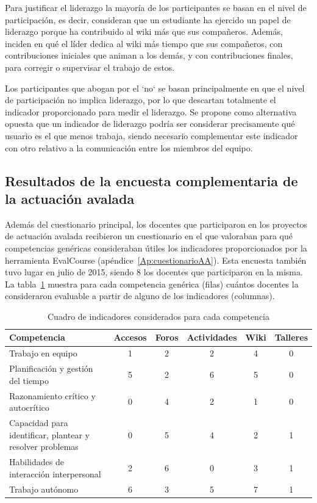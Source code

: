 Para justificar el liderazgo la mayoría de los participantes se basan en el nivel de participación, es decir, consideran que un estudiante ha ejercido un papel de liderazgo porque ha contribuido al wiki más que sus compañeros. Además, inciden en qué el líder dedica al wiki más tiempo que sus compañeros, con contribuciones iniciales que animan a los demás, y con contribuciones finales, para corregir o supervisar el trabajo de estos.

Los participantes que abogan por el `no` se basan principalmente en que el nivel de participación no implica liderazgo, por lo que descartan totalmente el indicador proporcionado para medir el liderazgo. Se propone como alternativa opuesta que un indicador de liderazgo podría ser considerar precisamente qué usuario es el que menos trabaja, siendo necesario complementar este indicador con otro relativo a la comunicación entre los miembros del equipo.

\subsection{Resultados de la encuesta complementaria de la actuación avalada}

Además del cuestionario principal, los docentes que participaron en los proyectos de actuación avalada recibieron un cuestionario en el que valoraban para qué competencias genéricas consideraban útiles los indicadores proporcionados por la herramienta EvalCourse (apéndice~\ref{Ap:cuestionarioAA}). Esta encuesta también tuvo lugar en julio de 2015, siendo 8 los docentes que participaron en la misma. La tabla~\ref{tab:indicador:competencia} muestra para cada competencia genérica (filas) cuántos docentes la consideraron evaluable a partir de alguno de los indicadores (columnas).

\begin{table}
	\centering
	\caption{Cuadro de indicadores considerados para cada competencia}
	\label{tab:indicador:competencia}
	\begin{tabular}{|m{3.8cm}|c|c|c|c|c|}
		\hline
		Competencia & Accesos & Foros & Actividades & Wiki & Talleres \\
		\hline
		\hline
		Trabajo en equipo & 1 & 2 & 2 & 4 & 0  \\
		\hline
		Planificación y gestión del tiempo & 5 & 2 & 6 & 5 & 0  \\
		\hline
		Razonamiento crítico y autocrítico & 0 & 4 & 2 & 1 & 0  \\
		\hline
		Capacidad para identificar, plantear y resolver problemas & 0 & 5 & 4 & 2 & 1 \\
		\hline
		Habilidades de interacción interpersonal & 2 & 6 & 0 & 3 & 1 \\
		\hline
		Trabajo autónomo & 6 & 3 & 5 & 7 & 1 \\
		\hline
	\end{tabular}
\end{table}

